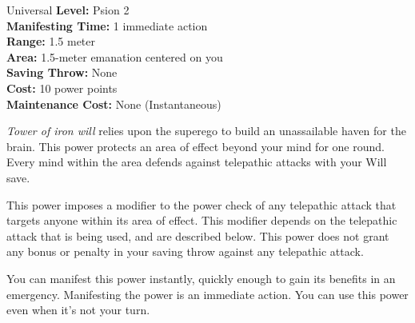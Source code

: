 {Universal}
{
	\textbf{Level:}
	Psion 2\\
	\textbf{Manifesting Time:}
	1 immediate action\\
	\textbf{Range:}
	1.5 meter\\
	\textbf{Area:}
	1.5-meter emanation centered on you\\
	\textbf{Saving Throw:}
	None\\
	\textbf{Cost:}
	10 power points\\
	\textbf{Maintenance Cost:}
	None (Instantaneous)\\
}
{
	\emph{Tower of iron will} relies upon the superego to build an unassailable haven for the brain. This power protects an area of effect beyond your mind for one round. Every mind within the area defends against telepathic attacks with your Will save.

	This power imposes a modifier to the power check of any telepathic attack that targets anyone within its area of effect. This modifier depends on the telepathic attack that is being used, and are described below. This power does not grant any bonus or penalty in your saving throw against any telepathic attack.


	You can manifest this power instantly, quickly enough to gain its benefits in an emergency. Manifesting the power is an immediate action. You can use this power even when it's not your turn.
}